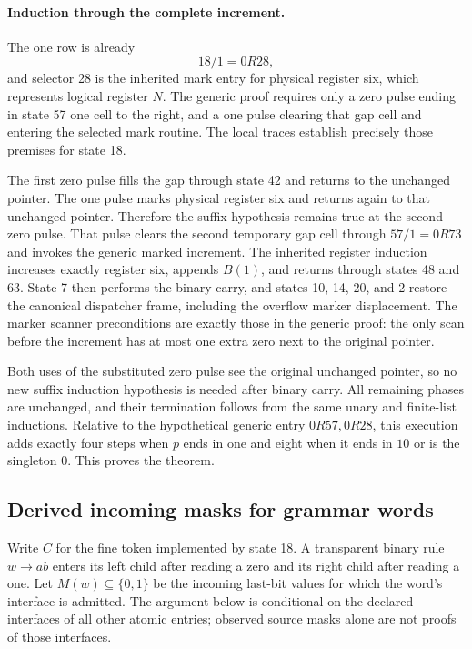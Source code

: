 \paragraph{Induction through the complete increment.}
The one row is already
\[
18/1=0R28,
\]
and selector 28 is the inherited mark entry for physical register six,
which represents logical register $N$. The generic proof requires only
a zero pulse ending in state 57 one cell to the right, and a one pulse
clearing that gap cell and entering the selected mark routine. The local
traces establish precisely those premises for state 18.

The first zero pulse fills the gap through state 42 and returns to the
unchanged pointer. The one pulse marks physical register six and returns
again to that unchanged pointer. Therefore the suffix hypothesis remains
true at the second zero pulse. That pulse clears the second temporary gap
cell through $57/1=0R73$ and invokes the generic marked increment. The
inherited register induction increases exactly register six, appends
$B(1)$, and returns through states 48 and 63. State 7 then performs the
binary carry, and states 10, 14, 20, and 2 restore the canonical dispatcher
frame, including the overflow marker displacement. The marker scanner
preconditions are exactly those in the generic proof: the only scan before
the increment has at most one extra zero next to the original pointer.

Both uses of the substituted zero pulse see the original unchanged pointer,
so no new suffix induction hypothesis is needed after binary carry. All
remaining phases are unchanged, and their termination follows from the same
unary and finite-list inductions. Relative to the hypothetical generic
entry $0R57,0R28$, this execution adds exactly four steps when $p$ ends in one
and eight when it ends in $10$ or is the singleton $0$. This proves the
theorem.

\subsection{Derived incoming masks for grammar words}

Write $C$ for the fine token implemented by state 18. A transparent binary
rule $w\to ab$ enters its left child after reading a zero and its right
child after reading a one. Let $M(w)\subseteq\{0,1\}$ be the incoming
last-bit values for which the word's interface is admitted. The argument
below is conditional on the declared interfaces of all other atomic
entries; observed source masks alone are not proofs of those interfaces.

